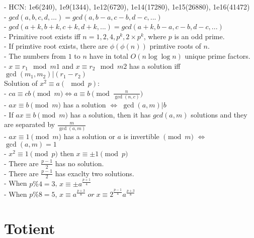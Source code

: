 - HCN: 1e6(240), 1e9(1344), 1e12(6720), 1e14(17280), 1e15(26880), 1e16(41472) \\
- \( gcd(a, b, c, d, ...) = gcd(a, b - a, c - b, d - c, ...) \) \\
- \( gcd(a + k, b + k, c + k, d + k, ...) = gcd(a + k, b - a, c - b, d - c, ...) \) \\
- Primitive root exists iff \( n = 1, 2, 4, p^k, 2\times p^k \), where \( p \) is an odd prime. \\
- If primtive root exists, there are \( \phi(\phi(n)) \) primtive roots of \( n \). \\
- The numbers from \( 1 \) to \( n \) have in total \( O(n\log\log n) \) unique prime factors. \\
- \( x \equiv r_1 \mod m1 \) and \( x \equiv r_2 \mod m2 \) has a solution iff \( \gcd(m_1, m_2) | (r_1 - r_2) \) \\
Solution of \( x^2 \equiv a (\mod p) \):\\
- \( ca \equiv cb \pmod{m} \iff a \equiv b \pmod{ \frac{n}{\gcd(n, c)}} \) \\
- \( ax \equiv b \pmod{m} \) has a solution \( \iff \) \( \gcd(a, m) | b \) \\
- If \( ax \equiv b \pmod{m} \) has a solution, then it has \( gcd(a, m) \) solutions and they are separated by \( \frac{m}{\gcd(a, m)} \) \\
- \( ax \equiv 1 \pmod{m} \) has a solution or \( a \) is invertible \( \pmod{m} \) \( \iff \) \(\gcd(a, m) = 1 \) \\
- \( x^2 \equiv 1 \pmod{p} \) then \( x \equiv \pm 1 \pmod{p} \) \\
- There are \( \frac{p - 1}{2} \) has no solution. \\
- There are \( \frac{p - 1}{2} \) has exaclty two solutions. \\
- When \( p \% 4 = 3 \), \( x \equiv \pm a^{\frac{p + 1}{4}} \) \\
- When \( p \% 8 = 5 \), \( x \equiv a^{\frac{p + 3}{8}} \; or \; x \equiv 2^{\frac{p - 1}{4}} a^{\frac{p + 3}{8}} \)

\section{Totient}


